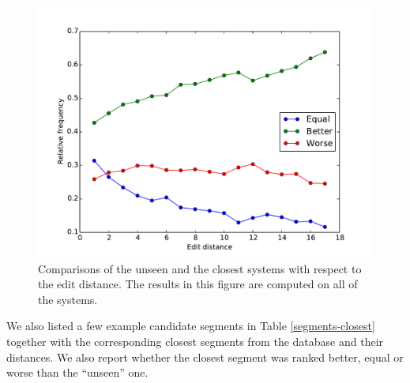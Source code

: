 \begin{figure}
    \begin{center}
        \includegraphics[width=14cm]{img/per-distance.pdf}
    \end{center}

    \caption[Comparisons of unseen and the closest systems with respect to the
    edit distance]{Comparisons of the unseen and the closest systems with respect
    to the edit distance. The results in this figure are computed on all of the
  systems.}

    \label{better-worse-equal-with-edit-distance}
\end{figure}




We also listed a few example candidate segments in Table
\ref{segments-closest} together with the corresponding closest segments from
the database and their distances. We also report whether the closest segment
was ranked better, equal or worse than the ``unseen'' one.


